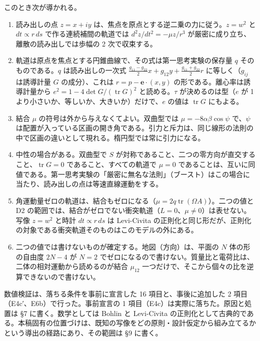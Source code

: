 \documentclass[
  a4paper,
]{ltjsarticle}
\providecommand{\tightlist}{%
  \setlength{\itemsep}{0pt}\setlength{\parskip}{0pt}}
\begin{document}
このとき次が導かれる。

\begin{enumerate}
\def\labelenumi{\arabic{enumi}.}
\tightlist
\item
  読み出しの点 \(z=x+iy\)
  は、焦点を原点とする逆二乗の力に従う。\(z=w^2\) と \(dt\propto r\,ds\)
  で作る連続補間の軌道では \(d^2z/dt^2=-\mu z/r^3\)
  が厳密に成り立ち、離散の読み出しでは歩幅の 2 次で収束する。
\item
  軌道は原点を焦点とする円錐曲線で、その式は第一思考実験の保存量 \(q\)
  そのものである。\(q\) は読み出しの一次式
  \(\frac{g_{11}-g_{22}}{2}x+g_{12}y+\frac{g_{11}+g_{22}}{2}r\)
  に等しく（\(g_{ij}\) は誘導計量 \(G\) の成分）、これは
  \(r=p-\mathbf e\cdot(x,y)\) の形である。離心率は誘導計量から
  \(e^2=1-4\det G/(\operatorname{tr}G)^2\) と読める。\(\tau\)
  が決めるのは型（\(e\) が 1
  より小さいか、等しいか、大きいか）だけで、\(e\) の値は
  \(\operatorname{tr}G\) にもよる。
\item
  結合 \(\mu\) の符号は外から与えなくてよい。双曲型では
  \(\mu=-8\alpha\beta\cos\psi\) で、\(\psi\)
  は配置が入っている区画の開き角である。引力と斥力は、同じ線形の法則の中で区画の違いとして現れる。楕円型では常に引力になる。
\item
  中性の場合がある。双曲型で \(S\)
  が対称であること、二つの零方向が直交すること、\(\operatorname{tr}G=0\)
  であること、すべての軌道で \(\mu=0\)
  であることは、互いに同値である。第一思考実験の「厳密に無名な法則」（ブースト）はこの場合に当たり、読み出しの点は等速直線運動をする。
\item
  角運動量ゼロの軌道は、結合もゼロになる（\(\mu=2q\operatorname{tr}(\Omega A)\)）。二つの値と
  D2
  の範囲では、結合がゼロでない衝突軌道（\(L=0\)、\(\mu\neq0\)）は表せない。写像
  \(z=w^2\) と時計 \(dt\propto r\,ds\) は Levi-Civita
  の正則化と同じ形だが、正則化の対象である衝突軌道そのものはこのモデルの外にある。
\item
  二つの値では書けないものが確定する。地図（方向）は、平面の \(N\)
  体の形の自由度 \(2N-4\) が \(N=2\)
  でゼロになるので書けない。質量比と電荷比は、二体の相対運動から読めるのが結合
  \(\mu_{12}\) 一つだけで、そこから個々の比を逆算できないので書けない。
\end{enumerate}

数値検証は、落ちる条件を事前に宣言した 16 項目と、事後に追加した 2
項目（E4c′、E6b）で行った。事前宣言の 1
項目（E4c）は実際に落ちた。原因と処置は §7 に書く。数学としては Bohlin
と Levi-Civita
の正則化として古典的である。本稿固有の位置づけは、既知の写像をどの原則・設計仮定から組み立てるかという導出の経路にあり、その範囲は
§9 に書く。
\end{document}
